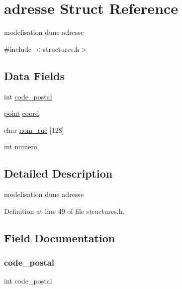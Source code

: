 \hypertarget{structadresse}{}\section{adresse Struct Reference}
\label{structadresse}


modelisation d\textquotesingle{}une adresse  




{\ttfamily \#include $<$structures.\+h$>$}

\subsection*{Data Fields}
\begin{DoxyCompactItemize}
\item 
int \hyperlink{structadresse_ace76748bee695a3ec62ff48ac876ebc2}{code\+\_\+postal}
\item 
\hyperlink{structpoint}{point} \hyperlink{structadresse_a16be187ac405f3bb61930a342b444253}{coord}
\item 
char \hyperlink{structadresse_a5aafcf02ad3be5a371655c227684be8e}{nom\+\_\+rue} \mbox{[}128\mbox{]}
\item 
int \hyperlink{structadresse_a2c30f43104974e72e2809fb4569804b0}{numero}
\end{DoxyCompactItemize}


\subsection{Detailed Description}
modelisation d\textquotesingle{}une adresse 

Definition at line 49 of file structures.\+h.



\subsection{Field Documentation}
\hypertarget{structadresse_ace76748bee695a3ec62ff48ac876ebc2}{}\label{structadresse_ace76748bee695a3ec62ff48ac876ebc2} 
\subsubsection{\texorpdfstring{code\+\_\+postal}{code\_postal}}
{\footnotesize\ttfamily int code\+\_\+postal}



